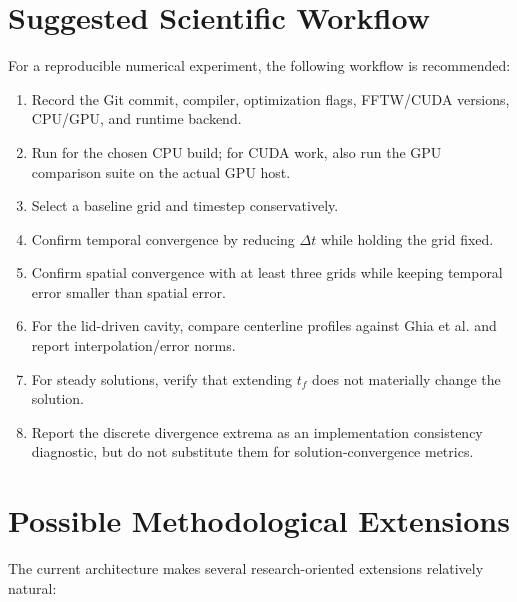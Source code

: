 \documentclass[11pt,a4paper]{article}
\newcommand{\dt}{\Delta t}
\newcommand{\code}[1]{\texttt{\detokenize{#1}}}
\begin{document}
\section{Suggested Scientific Workflow}

For a reproducible numerical experiment, the following workflow is recommended:

\begin{enumerate}[leftmargin=2em]
  \item Record the Git commit, compiler, optimization flags, FFTW/CUDA versions, CPU/GPU, and runtime backend.
  \item Run \code{make test} for the chosen CPU build; for CUDA work, also run the GPU comparison suite on the actual GPU host.
  \item Select a baseline grid and timestep conservatively.
  \item Confirm temporal convergence by reducing $\dt$ while holding the grid fixed.
  \item Confirm spatial convergence with at least three grids while keeping temporal error smaller than spatial error.
  \item For the lid-driven cavity, compare centerline profiles against Ghia et al. and report interpolation/error norms.
  \item For steady solutions, verify that extending $t_f$ does not materially change the solution.
  \item Report the discrete divergence extrema as an implementation consistency diagnostic, but do not substitute them for solution-convergence metrics.
\end{enumerate}

\section{Possible Methodological Extensions}

The current architecture makes several research-oriented extensions relatively natural:
\end{document}
